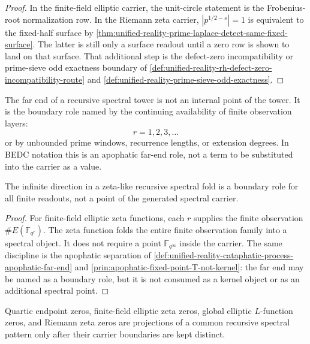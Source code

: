 \begin{proof}
In the finite-field elliptic carrier, the unit-circle statement is the
Frobenius-root normalization row.  In the Riemann zeta carrier,
$|p^{1/2-s}|=1$ is equivalent to the fixed-half surface by
\autoref{thm:unified-reality-prime-laplace-detect-same-fixed-surface}.
The latter is still only a surface readout until a zero row is shown to
land on that surface.  That additional step is the defect-zero
incompatibility or prime-sieve odd exactness boundary of
\autoref{def:unified-reality-rh-defect-zero-incompatibility-route} and
\autoref{def:unified-reality-prime-sieve-odd-exactness}.
\end{proof}

\begin{definition}
\label{def:unified-reality-recursive-spectral-apophatic-far-end}
The far end of a recursive spectral tower is not an internal point of the
tower.  It is the boundary role named by the continuing availability of
finite observation layers:
$$
r=1,2,3,\ldots
$$
or by unbounded prime windows, recurrence lengths, or extension degrees.
In BEDC notation this is an apophatic far-end role, not a term to be
substituted into the carrier as a value.
\end{definition}

\begin{theorem}
\label{thm:unified-reality-infinite-observation-time-not-spectral-point}
The infinite direction in a zeta-like recursive spectral fold is a
boundary role for all finite readouts, not a point of the generated
spectral carrier.
\end{theorem}

\begin{proof}
For finite-field elliptic zeta functions, each $r$ supplies the finite
observation $\#E(\mathbb F_{q^r})$.  The zeta function folds the entire
finite observation family into a spectral object.  It does not require a
point $\mathbb F_{q^\infty}$ inside the carrier.  The same discipline is
the apophatic separation of
\autoref{def:unified-reality-cataphatic-process-apophatic-far-end} and
\autoref{prin:apophatic-fixed-point-T-not-kernel}: the far end may be
named as a boundary role, but it is not consumed as a kernel object or
as an additional spectral point.
\end{proof}

\begin{theorem}
\label{thm:unified-reality-recursive-spectral-zero-hierarchy-principle}
Quartic endpoint zeros, finite-field elliptic zeta zeros, global elliptic
$L$-function zeros, and Riemann zeta zeros are projections of a common
recursive spectral pattern only after their carrier boundaries are kept
distinct.
\end{theorem}


